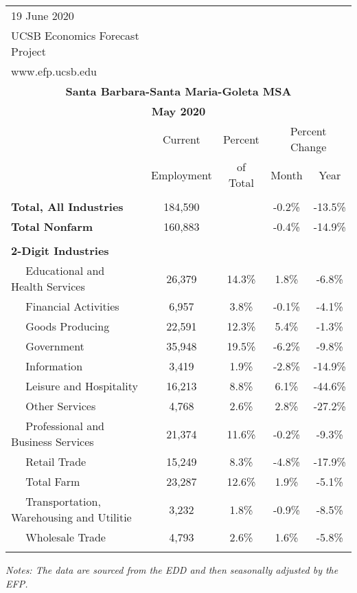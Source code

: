\documentclass[12pt]{article}
\begin{document}
\begin{landscape}
\begin{table}
\begin{tabular}{|l|c|c|c|c|}
\multicolumn{1}{l}{\small 19 June 2020} & \multicolumn{4}{c}{} \\
\multicolumn{1}{l}{\small UCSB Economics Forecast Project} & \multicolumn{4}{c}{} \\
\multicolumn{1}{l}{\small www.efp.ucsb.edu} & \multicolumn{4}{c}{} \\
\multicolumn{5}{c}{\large \textbf{Santa Barbara-Santa Maria-Goleta MSA}} \\
\multicolumn{5}{c}{\large \textbf{May 2020}} \
\multicolumn{5}{l}{\small Data Seasonally Adjusted} \\ \hline \hline
& Current & Percent & \multicolumn{2}{c}{Percent Change} \vline \\
& Employment & of Total & Month & Year \\ \hline
&&&& \\
\textbf{Total, All Industries} & 184,590 && -0.2\% & -13.5\% \\
\textbf{Total Nonfarm} & 160,883 && -0.4\% & -14.9\% \\
&&&& \\
\textbf{2-Digit Industries} &&&& \\
$\quad$ Educational and Health Services & 26,379 & 14.3\% & 1.8\% & -6.8\% \\
$\quad$ Financial Activities & 6,957 & 3.8\% & -0.1\% & -4.1\% \\
$\quad$ Goods Producing & 22,591 & 12.3\% & 5.4\% & -1.3\% \\
$\quad$ Government & 35,948 & 19.5\% & -6.2\% & -9.8\% \\
$\quad$ Information & 3,419 & 1.9\% & -2.8\% & -14.9\% \\
$\quad$ Leisure and Hospitality & 16,213 & 8.8\% & 6.1\% & -44.6\% \\
$\quad$ Other Services & 4,768 & 2.6\% & 2.8\% & -27.2\% \\
$\quad$ Professional and Business Services & 21,374 & 11.6\% & -0.2\% & -9.3\% \\
$\quad$ Retail Trade & 15,249 & 8.3\% & -4.8\% & -17.9\% \\
$\quad$ Total Farm & 23,287 & 12.6\% & 1.9\% & -5.1\% \\
$\quad$ Transportation, Warehousing and Utilitie & 3,232 & 1.8\% & -0.9\% & -8.5\% \\
$\quad$ Wholesale Trade & 4,793 & 2.6\% & 1.6\% & -5.8\% \\
&&&& \\ \hline \hline
\end{tabular}
\par
\vspace{.5em}
\footnotesize
\textit{Notes: The data are sourced from the EDD and then seasonally adjusted by the EFP.}
\end{table}
\end{landscape}
\end{document}
